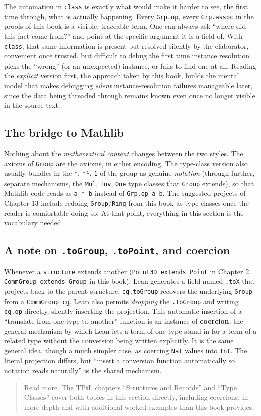 The automation in \texttt{class} is exactly what would make it harder to see, the first time through, what is actually happening. Every \texttt{Grp.op}, every \texttt{Grp.assoc} in the proofs of this book is a visible, traceable term. One can always ask ``where did this fact come from?'' and point at the specific argument it is a field of. With \texttt{class}, that same information is present but resolved silently by the elaborator, convenient once trusted, but difficult to debug the first time instance resolution picks the ``wrong'' (or an unexpected) instance, or fails to find one at all. Reading the \emph{explicit} version first, the approach taken by this book, builds the mental model that makes debugging \emph{silent} instance-resolution failures manageable later, since the data being threaded through remains known even once no longer visible in the source text.

\subsection{The bridge to Mathlib}\label{sec:05-rigor-check:01-structure-vs-class:4}

Nothing about the \emph{mathematical content} changes between the two styles. The axioms of \texttt{Group} are the axioms, in either encoding. The type-class version also usually bundles in the \texttt{*}, \texttt{⁻¹}, \texttt{1} of the group as genuine \emph{notation} (through further, separate mechanisms, the \texttt{Mul}, \texttt{Inv}, \texttt{One} type classes that \texttt{Group} extends), so that Mathlib code reads as \texttt{a * b} instead of \texttt{Grp.op a b}. The suggested projects of Chapter 13 include redoing \texttt{Group}/\texttt{Ring} from this book as type classes once the reader is comfortable doing so. At that point, everything in this section is the vocabulary needed.

\subsection{\texorpdfstring{A note on \texttt{.toGroup}, \texttt{.toPoint}, and coercion}{A note on .toGroup, .toPoint, and coercion}}\label{sec:05-rigor-check:01-structure-vs-class:5}

Whenever a \texttt{structure} extends another (\texttt{Point3D extends Point} in Chapter 2, \texttt{CommGroup extends Group} in this book), Lean generates a field named \texttt{.toX} that projects back to the parent structure. \texttt{cg.toGroup} recovers the underlying \texttt{Group} from a \texttt{CommGroup cg}. Lean also permits \emph{dropping} the \texttt{.toGroup} and writing \texttt{cg.op} directly, silently inserting the projection. This automatic insertion of a ``translate from one type to another'' function is an instance of \textbf{coercion}, the general mechanism by which Lean lets a term of one type stand in for a term of a related type without the conversion being written explicitly. It is the same general idea, though a much simpler case, as coercing \texttt{Nat} values into \texttt{Int}. The literal projection differs, but ``insert a conversion function automatically so notation reads naturally'' is the shared mechanism.

\begin{quote}
Read more. The TPiL chapters ``Structures and Records'' and ``Type Classes'' cover both topics in this section directly, including coercions, in more depth and with additional worked examples than this book provides.
\end{quote}
